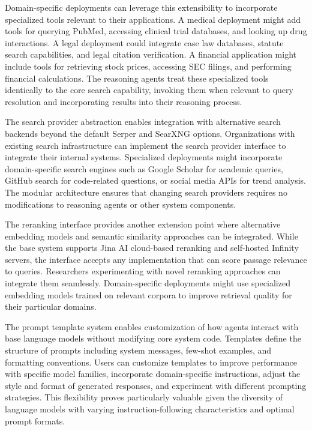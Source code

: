 Domain-specific deployments can leverage this extensibility to incorporate specialized tools relevant to their applications. A medical deployment might add tools for querying PubMed, accessing clinical trial databases, and looking up drug interactions. A legal deployment could integrate case law databases, statute search capabilities, and legal citation verification. A financial application might include tools for retrieving stock prices, accessing SEC filings, and performing financial calculations. The reasoning agents treat these specialized tools identically to the core search capability, invoking them when relevant to query resolution and incorporating results into their reasoning process.

The search provider abstraction enables integration with alternative search backends beyond the default Serper and SearXNG options. Organizations with existing search infrastructure can implement the search provider interface to integrate their internal systems. Specialized deployments might incorporate domain-specific search engines such as Google Scholar for academic queries, GitHub search for code-related questions, or social media APIs for trend analysis. The modular architecture ensures that changing search providers requires no modifications to reasoning agents or other system components.

The reranking interface provides another extension point where alternative embedding models and semantic similarity approaches can be integrated. While the base system supports Jina AI cloud-based reranking and self-hosted Infinity servers, the interface accepts any implementation that can score passage relevance to queries. Researchers experimenting with novel reranking approaches can integrate them seamlessly. Domain-specific deployments might use specialized embedding models trained on relevant corpora to improve retrieval quality for their particular domains.

The prompt template system enables customization of how agents interact with base language models without modifying core system code. Templates define the structure of prompts including system messages, few-shot examples, and formatting conventions. Users can customize templates to improve performance with specific model families, incorporate domain-specific instructions, adjust the style and format of generated responses, and experiment with different prompting strategies. This flexibility proves particularly valuable given the diversity of language models with varying instruction-following characteristics and optimal prompt formats.

